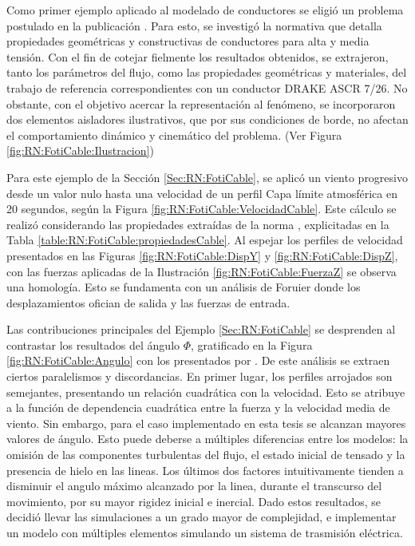  Como primer ejemplo aplicado al modelado de conductores se eligió un problema postulado en la publicación \citep{Foti2016}. Para esto, se investigó la normativa \cite{IEC60826} que detalla propiedades geométricas y constructivas de conductores para alta y media tensión.  Con el fin de cotejar fielmente los resultados obtenidos, se extrajeron, tanto los parámetros del flujo, como las propiedades geométricas y materiales, del trabajo de referencia correspondientes con un conductor DRAKE ASCR 7/26. No obstante, con el objetivo acercar la representación al fenómeno, se incorporaron dos elementos aisladores ilustrativos, que por sus condiciones de borde, no afectan el comportamiento dinámico y cinemático del problema. (Ver Figura \ref{fig:RN:FotiCable:Ilustracion})
 
 Para este ejemplo de la Sección \ref{Sec:RN:FotiCable}, se aplicó un viento progresivo desde un valor nulo hasta una velocidad de un perfil Capa límite atmosférica en 20 segundos, según la Figura \ref{fig:RN:FotiCable:VelocidadCable}. Este cálculo se realizó considerando las propiedades extraídas de la norma \citep{IEC60826}, explicitadas en la Tabla \ref{table:RN:FotiCable:propiedadesCable}. Al espejar los perfiles de velocidad presentados en las Figuras \ref{fig:RN:FotiCable:DispY} y \ref{fig:RN:FotiCable:DispZ}, con las fuerzas aplicadas de la Ilustración \ref{fig:RN:FotiCable:FuerzaZ} se observa una homología. Esto se fundamenta con un análisis de Foruier donde los desplazamientos ofician de salida y las fuerzas de entrada. 
 
 Las contribuciones principales del Ejemplo \ref{Sec:RN:FotiCable} se desprenden al contrastar los resultados del ángulo $\Phi$, gratificado en la Figura \ref{fig:RN:FotiCable:Angulo} con los presentados por \citeauthor{Foti2016}. De este análisis se extraen ciertos paralelismos y discordancias. En primer lugar, los perfiles arrojados son semejantes, presentando un relación cuadrática con la velocidad. Esto se atribuye a la función de dependencia cuadrática entre la fuerza y la velocidad media de viento. Sin embargo, para el caso implementado en esta tesis se alcanzan mayores valores de ángulo. Esto puede deberse a múltiples diferencias entre los modelos: la omisión de las componentes turbulentas del flujo, el estado inicial de tensado y la presencia de hielo en las lineas. Los últimos dos factores intuitivamente tienden a disminuir el angulo máximo alcanzado por la linea, durante el transcurso del movimiento, por su mayor rigidez inicial e inercial. Dado estos resultados, se decidió llevar las simulaciones a un grado mayor de complejidad, e implementar un modelo con múltiples elementos simulando un sistema de trasmisión eléctrica.  
 
